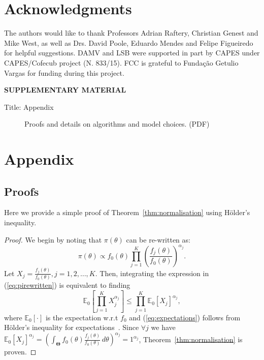 \documentclass[12pt]{article}
\begin{document}
\section*{Acknowledgments}

The authors would like to thank Professors Adrian Raftery, Christian Genest and Mike West, as well as  Drs. David Poole, Eduardo Mendes and Felipe Figueiredo for helpful suggestions.
DAMV and LSB were supported in part by CAPES under CAPES/Cofecub project (N. 833/15).
FCC is grateful to Funda\c{c}\~ao Getulio Vargas for funding during this 
project.
% 

\bigskip
\begin{center}
{\large\bf SUPPLEMENTARY MATERIAL}
\end{center}

\begin{description}

\item[Title: Appendix] Proofs and details on algorithms and model choices. (PDF)

\end{description}

% 
% 

\newpage 

\appendix
\section{Appendix}
\renewcommand\thefigure{S\arabic{figure}}    
\setcounter{figure}{0} 

\subsection{Proofs}
\label{sec:appendix_proofs}

Here we provide a simple proof of Theorem~\ref{thm:normalisation} using H\"{o}lder's inequality.
\begin{proof}
We begin by noting that $\pi(\theta)$ can be re-written as:
\begin{equation}
\label{eq:pirewritten}
 \pi(\theta) \propto f_0(\theta)\prod_{j=1}^{K} \left(\frac{f_j(\theta)}{f_0(\theta)}\right)^{\alpha_j}.
\end{equation}
Let $X_j = \frac{f_j(\theta)}{f_0(\theta)}, j=1, 2,\ldots, K$. 
Then, integrating the expression in (\ref{eq:pirewritten}) is equivalent to finding 
\begin{equation}
\label{eq:expectations}
\mathbb{E}_{0}\left[\prod_{j=1}^KX_j^{\alpha_j}\right] \leq \prod_{j=1}^K \mathbb{E}_{0}[X_j]^{\alpha_j},
\end{equation}
where $\mathbb{E}_{0}[\cdot]$ is the expectation w.r.t $f_0$ and (\ref{eq:expectations}) follows from H\"{o}lder's inequality for expectations~\parencite{Yeh2011}.
Since $\forall j$ we have $\mathbb{E}_{0}[X_j]^{\alpha_j} = \left(\int_{\boldsymbol\Theta}f_0(\theta)\frac{f_j(\theta)}{f_0(\theta)}\, d\theta\right)^{\alpha_j}=1^{\alpha_j}$, Theorem~\ref{thm:normalisation} is proven.
\end{proof}
\end{document}
